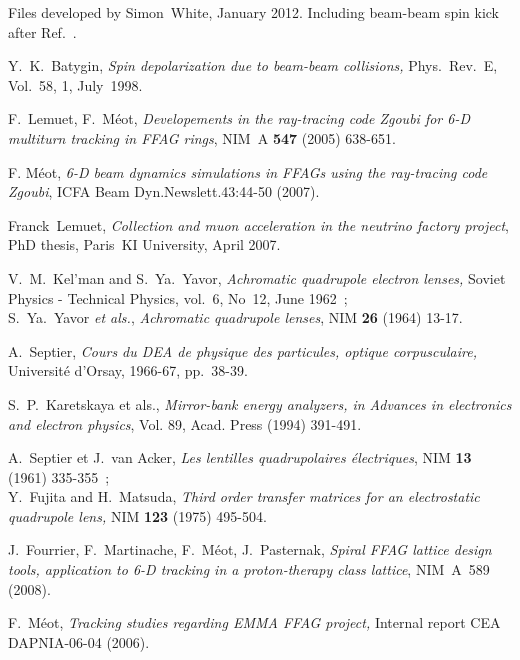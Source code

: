 \begin{thebibliography}{99}
\newpage



 Files developed by Simon~White, January 2012. Including beam-beam spin kick after Ref.~\cite{YKBatyginSpin}. 

Y.~K.~Batygin, 
\textsl{Spin depolarization due to beam-beam collisions, } 
Phys.~Rev.~E, Vol.~58,  1, July~1998. 

F.~Lemuet, F.~M\'eot, 
\textsl{Developements in the ray-tracing code Zgoubi for 6-D multiturn tracking in FFAG rings}, 
NIM~A \textbf{547} (2005) 638-651. 

 F. M\'eot,  
\textsl{6-D beam dynamics simulations in FFAGs using the ray-tracing code Zgoubi}, 
ICFA Beam Dyn.Newslett.43:44-50 (2007).

Franck~Lemuet, 
\textsl{Collection and muon acceleration in the neutrino factory project}, 
PhD thesis, Paris~KI University, April 2007. 

V.~M.~Kel'man and S.~Ya.~Yavor, 
\textsl{Achromatic quadrupole electron lenses, } 
Soviet Physics - Technical Physics, vol.~6, No~12, June 1962~; \\
S.~Ya.~Yavor \textsl{et als.}, 
\textsl{Achromatic quadrupole lenses}, 
NIM \textbf{26} (1964) 13-17. 

A.~Septier, 
\textsl{Cours du DEA de physique des particules, optique corpusculaire,}  
Universit\'e d'Orsay, 1966-67, pp.~38-39.  

S.~P.~Karetskaya et als., 
\textsl{Mirror-bank energy analyzers, in Advances in electronics and electron physics}, 
Vol. 89, Acad. Press (1994) 391-491. 

A.~Septier et J.~van Acker, 
\textsl{Les lentilles quadrupolaires \'electriques}, 
NIM \textbf{13} (1961) 335-355~; \\
Y.~Fujita and H.~Matsuda, 
\textsl{Third order transfer matrices for an electrostatic quadrupole lens,} 
NIM \textbf{123} (1975) 495-504. 

J.~Fourrier, F.~Martinache, F.~M\'eot, J.~Pasternak, 
\textsl{Spiral FFAG lattice design tools,  application to 6-D tracking in a proton-therapy class lattice}, 
NIM~A~589 (2008). 

F.~M\'eot, 
\textsl{Tracking studies regarding EMMA FFAG project, }
Internal report CEA DAPNIA-06-04 (2006). 


\end{thebibliography}

